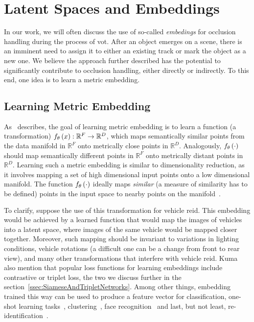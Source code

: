 \section{Latent Spaces and Embeddings}
\label{sec:LatentSpacesAndEmbeddings}

In our work, we will often discuss the use of so-called \emph{embedings} for occlusion handling during the process of \gls{vot}. After an object emerges on a scene, there is an imminent need to assign it to either an existing track or mark the object as a new one. We believe the approach further described has the potential to significantly contribute to occlusion handling, either directly or indirectly. To this end, one idea is to learn a metric embedding. 

\subsection{Learning Metric Embedding}
\label{ssec:LearningMetricEmbedding}

As~\cite{hermans2017triplet} describes, the goal of learning metric embedding is to learn a function (a transformation) ${f_\theta} \left( x \right): \mathbb{R}^F \to \mathbb{R}^D$, which maps semantically similar points from the data manifold in $\mathbb{R}^F$ onto metrically close points in $\mathbb{R}^D$. Analogously, ${f_\theta} \left( \cdot \right)$ should map semantically different points in $\mathbb{R}^F$ onto metrically distant points in $\mathbb{R}^D$. Learning such a metric embedding is similar to dimensionality reduction, as it involves mapping a set of high dimensional input points onto a low dimensional manifold. The function ${f_\theta} \left( \cdot \right)$ ideally maps \emph{similar} (a measure of similarity has to be defined) points in the input space to nearby points on the manifold~\cite{hadsell2006dimreduction}.

To clarify, suppose the use of this transformation for vehicle \gls{reid}. This embedding would be achieved by a learned function that would map the images of vehicles into a latent space, where images of the same vehicle would be mapped closer together. Moreover, such mapping should be invariant to variations in lighting conditions, vehicle rotations (a difficult one can be a change from front to rear view), and many other transformations that interfere with vehicle \gls{reid}. Kuma~\etal{}~\cite{kuma2019vehiclereid} also mention that popular loss functions for learning embeddings include contrastive or triplet loss, the two we discuss further in the section~\ref{ssec:SiameseAndTripletNetworks}. Among other things, embedding trained this way can be used to produce a feature vector for classification, one-shot learning tasks~\cite{koch2015siameseoneshot}, clustering~\cite{schroff2015facenet}, face recognition~\cite{parkhi2015deepface} and last, but not least, re-identification~\cite{kuma2019vehiclereid}.

